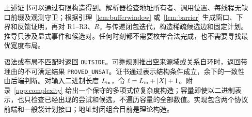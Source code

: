 上述证书可以通过有限构造得到。解析器检查地址所有者、调用位置、每线程无缺口前缀及观测守卫；根据引理~\ref{lem:bufferwindow} 或~\ref{lem:barrier} 生成窗口、下界和反馈证明，再对 R1--R3、$R_\forall$ 与传递闭包迭代，构造稀疏候选边和固定计划。推导只涉及显式事件和候选对。任何时刻都不需要枚举合法完成，也不需要寻找最优宽度布局。

语法或布局不匹配时返回 \texttt{OUTSIDE}。可靠规则推出空来源域或关系自环时，返回带理由的不可满足结果 \texttt{PROVED\_UNSAT}。证书通过表示结构条件成立，余下的一致性由后端判断。对输入二进制长度 $L_{\rm in}$，令 $\ell=L_{\rm in}+|X|+1$。附录~\ref{app:complexity} 给出一个保守的多项式位复杂度构造；容量即使以二进制表示，也只检查已经出现的尝试和候选，不遍历容量的全部数值。实现包含两个协议前端和一般袋计划接口；地址封闭组合目前是理论构造。
